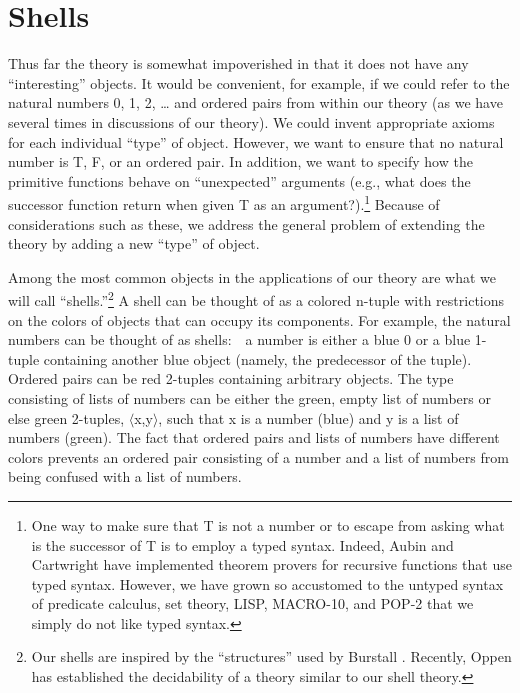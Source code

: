 \documentclass[10pt]{book}
\begin{document}
\section{Shells}
\label{SSNEWDATATYPES}
Thus far the theory is somewhat impoverished in that it does not
have any ``interesting'' objects.  It would be convenient,
for example, if we could refer to the natural numbers 0, 1, 2, \ldots{}
and ordered pairs from within our theory (as we have several
times in  discussions of our theory).  We could invent appropriate
axioms for each individual ``type'' of object.  However, we want to
ensure that no natural number is T, F, or an ordered pair.
In addition, we want to specify how the primitive functions behave
on ``unexpected''
arguments (e.g., what does the successor function return when given T as an
argument?).\footnote{One way to make sure that T is not a number or to escape from asking what is the successor of T is to employ a typed syntax.  Indeed, Aubin \cite{AUBIN} and Cartwright \cite{CARTWRIGHT} have implemented theorem provers for recursive functions that use typed syntax. However, we have grown so accustomed to the untyped syntax of predicate calculus, set theory, LISP, MACRO-10, and POP-2 that we simply do not like typed syntax.}
Because of considerations such as these, we address the general problem of extending the theory
by adding a new ``type'' of object.

Among the most common objects in the applications of our theory
are what we will call ``shells.''\footnote{Our shells are inspired by the ``structures'' used by Burstall \cite{BURSTALL}. Recently, Oppen \cite{OPPEN} has established the decidability of a theory similar to our shell theory.}
A shell can be thought of as
a colored n-tuple with restrictions on the colors of objects that
can occupy its components.  For example, the natural numbers
can be thought of  as shells:~~a number is either a blue 0 or a
blue 1-tuple containing another blue object (namely, the predecessor  of the 
tuple).  Ordered pairs can be red 2-tuples
containing arbitrary objects.  The type consisting of lists of numbers
can be either the  green, empty list of numbers or else green 2-tuples, $\langle$x,y$\rangle$, such 
that x is a number (blue) and y is a list of numbers (green).  The fact that 
ordered pairs and
lists of numbers have different colors prevents an ordered pair consisting of
a
number and a list of numbers from being confused with a list of numbers.
\end{document}
